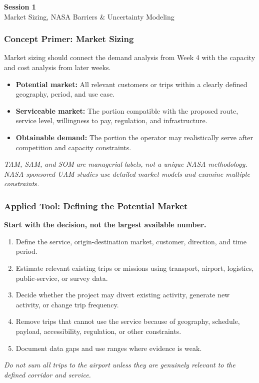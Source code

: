 \documentclass{beamer}
\begin{document}
\begin{frame}[c]
  \begin{center}
    \huge\color{cuhkpurple}\textbf{Session 1}\\
    \vspace{0.5cm}
    \Large Market Sizing, NASA Barriers \& Uncertainty Modeling
  \end{center}
\end{frame}

\begin{frame}[t]
\frametitle{Concept Primer: Market Sizing}
Market sizing should connect the demand analysis from Week 4 with the capacity and cost analysis from later weeks.
\begin{itemize}
\item \textbf{Potential market:} All relevant customers or trips within a clearly defined geography, period, and use case.
\item \textbf{Serviceable market:} The portion compatible with the proposed route, service level, willingness to pay, regulation, and infrastructure.
\item \textbf{Obtainable demand:} The portion the operator may realistically serve after competition and capacity constraints.
\end{itemize}
\textit{TAM, SAM, and SOM are managerial labels, not a unique NASA methodology. NASA-sponsored UAM studies use detailed market models and examine multiple constraints.}
\end{frame}

\begin{frame}[t]
\frametitle{Applied Tool: Defining the Potential Market}
\textbf{Start with the decision, not the largest available number.}
\begin{enumerate}
\item Define the service, origin-destination market, customer, direction, and time period.
\item Estimate relevant existing trips or missions using transport, airport, logistics, public-service, or survey data.
\item Decide whether the project may divert existing activity, generate new activity, or change trip frequency.
\item Remove trips that cannot use the service because of geography, schedule, payload, accessibility, regulation, or other constraints.
\item Document data gaps and use ranges where evidence is weak.
\end{enumerate}
\textit{Do not sum all trips to the airport unless they are genuinely relevant to the defined corridor and service.}
\end{frame}
\end{document}
